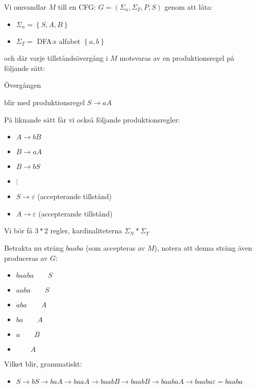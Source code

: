 \noindent Vi omvandlar $M$ till en CFG: $G = \left(\Sigma_n,\Sigma_T,P,S\right)$ genom att låta:
\begin{itemize}
  \item $\Sigma_n = \left\{S,A,B\right\}$
  \item $\Sigma_T =$ DFA:s alfabet $\left\{a,b\right\}$
\end{itemize}\par
\noindent och där varje tillståndsövergång i $M$ motsvaras av en produktionsregel på följande sätt:\par\noindent Övergången
\begin{figure}[ht!]
    \centering
    \caption{}
\end{figure} blir med produktionsregel $S\to aA$\par
\noindent På liknande sätt får vi också följande produktionsregler:
\begin{itemize}
  \item $A\to bB$
  \item $B\to aA$
  \item $B\to bS$
  \item $\vdots$
  \item $S\to\varepsilon$ (accepterande tillstånd)
  \item $A\to\varepsilon$ (accepterande tillstånd)
\end{itemize}
\par\bigskip
\noindent Vi bör få $3*2$ regler, kardinaliteterna $\Sigma_N*\Sigma_T$
\par\bigskip
\noindent Betrakta nu sträng $baaba$ (som accepteras av $M$), notera att denna sträng även produceras av $G$:
\begin{itemize}
  \item $baaba\qquad S$
  \item $aaba\qquad S$
  \item $aba\qquad A$
  \item $ba\qquad A$
  \item $a\qquad B$
  \item $\qquad A$
\end{itemize}\par
\noindent Vilket blir, grammatiskt:
\begin{itemize}
  \item $S\to bS\to baA\to baaA\to baabB\to baabB\to baabaA\to baaba\varepsilon = baaba$
\end{itemize}
